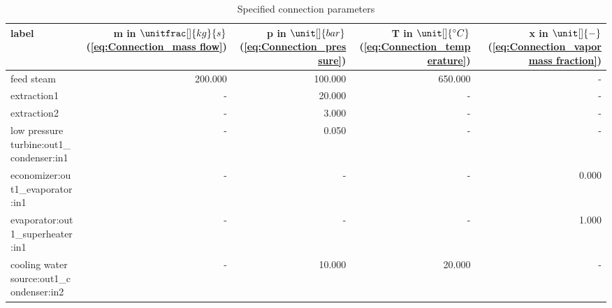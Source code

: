 \begin{table}[H]\begin{center}
\begin{tabular}{lrrrr}
\toprule
                                    label &  m in $\unitfrac[]{kg}{s}$ (\ref{eq:Connection_mass flow}) &  p in $\unit[]{bar}$ (\ref{eq:Connection_pressure}) &  T in $\unit[]{^\circ C}$ (\ref{eq:Connection_temperature}) &  x in $\unit[]{-}$ (\ref{eq:Connection_vapor mass fraction}) \\
\midrule
                               feed steam &                                                    200.000 &                                             100.000 &                                                     650.000 &                                                            - \\
                              extraction1 &                                                          - &                                              20.000 &                                                           - &                                                            - \\
                              extraction2 &                                                          - &                                               3.000 &                                                           - &                                                            - \\
 low pressure turbine:out1\_condenser:in1 &                                                          - &                                               0.050 &                                                           - &                                                            - \\
          economizer:out1\_evaporator:in1 &                                                          - &                                                   - &                                                           - &                                                        0.000 \\
         evaporator:out1\_superheater:in1 &                                                          - &                                                   - &                                                           - &                                                        1.000 \\
 cooling water source:out1\_condenser:in2 &                                                          - &                                              10.000 &                                                      20.000 &                                                            - \\
\bottomrule
\end{tabular}
\caption{Specified connection parameters}
\end{center}\end{table}

